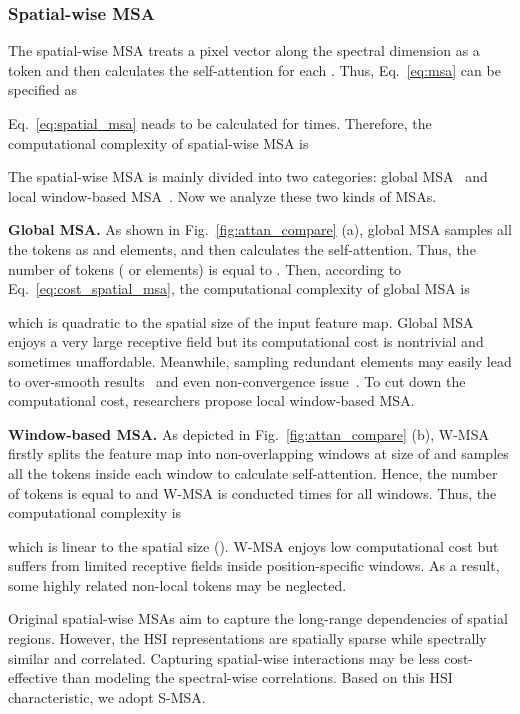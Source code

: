 \documentclass[10pt,twocolumn,letterpaper]{article}
\begin{document}
\subsubsection{Spatial-wise MSA}
The spatial-wise MSA treats a pixel vector along the spectral dimension as a token and then calculates the self-attention for each . Thus, Eq.~\eqref{eq:msa} can be specified as

Eq.~\eqref{eq:spatial_msa} neads to be calculated for  times. Therefore, the computational complexity of spatial-wise MSA is

The spatial-wise MSA is mainly divided into two categories: global MSA~\cite{global_msa} and local window-based MSA~\cite{liu2021swin}. Now we analyze these two kinds of MSAs.

\noindent\textbf{Global MSA.} As shown in Fig.~\ref{fig:attan_compare} (a), global MSA samples all the tokens as  and  elements, and then calculates the self-attention. Thus, the number of tokens  ( or  elements) is equal to . Then, according to Eq.~\eqref{eq:cost_spatial_msa}, the computational complexity of global MSA is

which is quadratic to the spatial size of the input feature map. Global MSA enjoys a very large receptive field but its computational cost is nontrivial and sometimes unaffordable. Meanwhile, sampling redundant  elements may easily lead to over-smooth results~\cite{xiangtl_gald} and even non-convergence issue~\cite{de_detr}. To cut down the computational cost, researchers propose local window-based MSA.


\noindent\textbf{Window-based MSA.} As depicted in Fig.~\ref{fig:attan_compare} (b), W-MSA firstly splits the feature map into non-overlapping windows at size of  and samples all the tokens inside each window to calculate self-attention. Hence, the number of tokens  is equal to  and W-MSA is conducted  times for all windows. Thus, the computational complexity is 

which is linear to the spatial size (). W-MSA enjoys low computational cost but suffers from limited receptive fields inside position-specific windows. As a result, some highly related non-local tokens may be neglected. 

Original spatial-wise MSAs aim to capture the long-range dependencies of spatial regions. However, the HSI representations are spatially sparse while spectrally similar and correlated. Capturing spatial-wise interactions may be less cost-effective than modeling the spectral-wise correlations. Based on this HSI characteristic, we adopt S-MSA.
\end{document}
